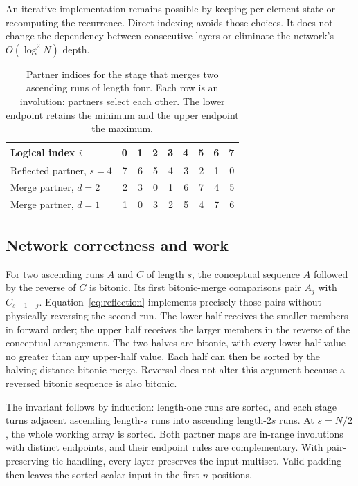 \documentclass[fleqn,10pt,lineno]{wlpeerj}
\begin{document}
An iterative implementation remains possible by keeping per-element state or recomputing the recurrence. Direct indexing avoids those choices. It does not change the dependency between consecutive layers or eliminate the network's $O(\log^2N)$ depth.

\begin{table}[tb]
\centering
\begin{tabular}{lrrrrrrrr}
\toprule
Logical index $i$ & 0&1&2&3&4&5&6&7\\
\midrule
Reflected partner, $s=4$ &7&6&5&4&3&2&1&0\\
Merge partner, $d=2$ &2&3&0&1&6&7&4&5\\
Merge partner, $d=1$ &1&0&3&2&5&4&7&6\\
\bottomrule
\end{tabular}
\caption{Partner indices for the stage that merges two ascending runs of length four. Each row is an involution: partners select each other. The lower endpoint retains the minimum and the upper endpoint the maximum.}
\label{tab:partners}
\end{table}

\subsection*{Network correctness and work}
\label{sec:correctness}
For two ascending runs $A$ and $C$ of length $s$, the conceptual sequence $A$ followed by the reverse of $C$ is bitonic. Its first bitonic-merge comparisons pair $A_j$ with $C_{s-1-j}$. Equation~\ref{eq:reflection} implements precisely those pairs without physically reversing the second run. The lower half receives the smaller members in forward order; the upper half receives the larger members in the reverse of the conceptual arrangement. The two halves are bitonic, with every lower-half value no greater than any upper-half value. Each half can then be sorted by the halving-distance bitonic merge. Reversal does not alter this argument because a reversed bitonic sequence is also bitonic.

The invariant follows by induction: length-one runs are sorted, and each stage turns adjacent ascending length-$s$ runs into ascending length-$2s$ runs. At $s=N/2$, the whole working array is sorted. Both partner maps are in-range involutions with distinct endpoints, and their endpoint rules are complementary. With pair-preserving tie handling, every layer preserves the input multiset. Valid padding then leaves the sorted scalar input in the first $n$ positions.
\end{document}

